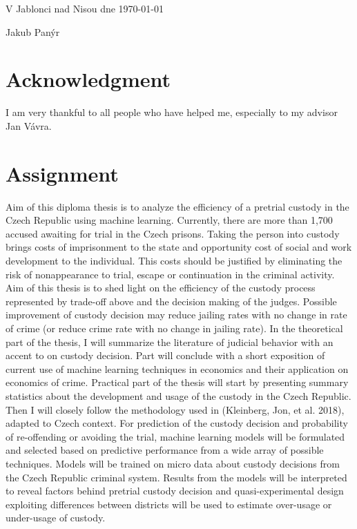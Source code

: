 \documentclass[12pt, twoside]{book} %
\begin{document}
\vspace*{\fill}
\noindent
V Jablonci nad Nisou dne \today \hfill \dotfill

\begin{minipage}{\textwidth}
\hfill Jakub Panýr \hspace*{2.5cm}
\end{minipage} \newpage

\section*{Acknowledgment}        %
\noindent I am very thankful to all people who have helped me, especially to my advisor Jan Vávra. \newpage

\section*{Assignment}           %
Aim of this diploma thesis is to analyze the efficiency of a pretrial custody in the Czech Republic using machine learning.\newline
Currently, there are more than 1,700 accused awaiting for trial in the Czech prisons. Taking the person into custody brings costs of imprisonment to the state and opportunity cost of social and work development to the individual. This costs should be justified by eliminating the risk of nonappearance to trial, escape or continuation in the criminal activity. Aim of this thesis is to shed light on the efficiency of the custody process represented by trade-off above and the decision making of the judges. Possible improvement of custody decision may reduce jailing rates with no change in rate of crime (or reduce crime rate with no change in jailing rate). \newline
In the theoretical part of the thesis, I will summarize the literature of judicial behavior with an accent to on custody decision. Part will conclude with a short exposition of current use of machine learning techniques in economics and their application on economics of crime. \newline
Practical part of the thesis will start by presenting summary statistics about the development and usage of the custody in the Czech Republic. Then I will closely follow the methodology used in (Kleinberg, Jon, et al. 2018), adapted to Czech context. For prediction of the custody decision and probability of re-offending or avoiding the trial, machine learning models will be formulated and selected based on predictive performance from a wide array of possible techniques. Models will be trained on micro data about custody decisions from the Czech Republic criminal system. Results from the models will be interpreted to reveal factors behind pretrial custody decision and quasi-experimental design exploiting differences between districts will be used to estimate over-usage or under-usage of custody. \newpage
\end{document}
